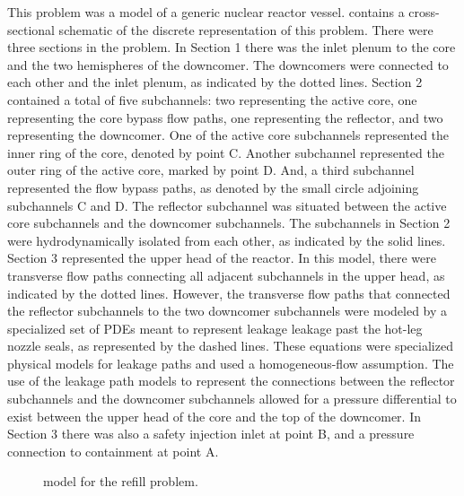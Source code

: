This problem was a model of a generic nuclear reactor vessel.
 contains a cross-sectional schematic of the discrete representation of this problem.
There were three sections in the problem.
In Section 1 there was the inlet plenum to the core and the two hemispheres of the downcomer.
The downcomers were connected to each other and the inlet plenum, as indicated by the dotted lines.
Section 2 contained a total of five subchannels: two representing the active core, one representing the core bypass flow paths, one representing the reflector, and two representing the downcomer.
One of the active core subchannels represented the inner ring of the core, denoted by point C.
Another subchannel represented the outer ring of the active core, marked by point D.
And, a third subchannel represented the flow bypass paths, as denoted by the small circle adjoining subchannels C and D.
The reflector subchannel was situated between the active core subchannels and the downcomer subchannels.
The subchannels in Section 2 were hydrodynamically isolated from each other, as indicated by the solid lines.
Section 3 represented the upper head of the reactor.
In this model, there were transverse flow paths connecting all adjacent subchannels in the upper head, as indicated by the dotted lines.
However, the transverse flow paths that connected the reflector subchannels to the two downcomer subchannels were modeled by a specialized set of PDEs meant to represent leakage leakage past the hot-leg nozzle seals, as represented by the dashed lines.
These equations were specialized physical models for leakage paths and used a homogeneous-flow assumption.
The use of the leakage path models to represent the connections between the reflector subchannels and the downcomer subchannels allowed for a pressure differential to exist between the upper head of the core and the top of the downcomer.
In Section 3 there was also a safety injection inlet at point B, and a pressure connection to containment at point A.

\begin{figure}[h!tb]
\centering

\caption{\cobra{} model for the refill problem.}
\label{fig:refillModel}
\end{figure}

